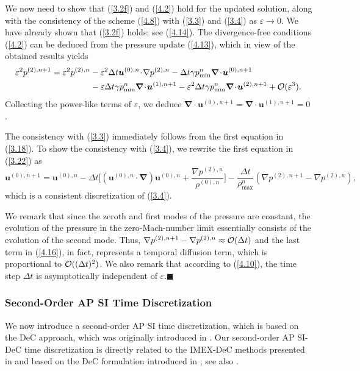 \documentclass[A4paper,12pt,twoside]{article}
\newenvironment{proof}{{\flushleft \bf Proof:}}{}
\numberwithin{equation}{section}
\numberwithin{figure}{section}
\numberwithin{table}{section}
\def\bnabla{\bm{\nabla}}
\newcommand{\dt}{\Delta t}
\newcommand{\ve}{\varepsilon}
\newcommand\eref[1]{(\ref{#1})}
\begin{document}
\begin{proof}
We now need to show that \eref{3.2f} and \eref{4.2} hold for the updated solution, along with the consistency of the scheme \eref{4.8} with
\eref{3.3} and \eref{3.4} as $\ve\to0$. We have already shown that \eref{3.2f} holds; see \eref{4.14}. The divergence-free conditions
\eref{4.2} can be deduced from the pressure update \eref{4.13}, which in view of the obtained results yields
$$
\begin{aligned}
\ve^2p^{(2),n+1}=\ve^2p^{(2),n}&-\ve^2\dt\bm u^{(0),n}\!\cdot\!\nabla p^{(2),n}-\dt\gamma p_{\min}^n\bnabla\!\cdot\!\bm u^{(0),n+1}\\
&-\ve\dt\gamma p_{\min}^n\bnabla\!\cdot\!\bm u^{(1),n+1}-\ve^2\dt\gamma p_{\min}^n\bnabla\!\cdot\!\bm u^{(2),n+1}+{\cal O}(\ve^3).
\end{aligned}
$$
Collecting the power-like terms of $\ve$, we deduce $\bnabla\!\cdot\!\bm u^{(0),n+1}=\bnabla\!\cdot\!\bm u^{(1),n+1}=0$.

The consistency with \eref{3.3} immediately follows from the first equation in \eref{3.18}. To show the consistency with \eref{3.4}, we
rewrite the first equation in \eref{3.22} as
\begin{equation}
\bm u^{(0),n+1}=\bm u^{(0),n}-\dt\bigg[(\bm u^{(0),n}\!\cdot\!\bnabla)\bm u^{(0),n}+\frac{\nabla p^{(2),n}}{\rho^{(0),n}}\bigg]
-\frac{\dt}{\rho_{\max}^n}\left(\nabla p^{(2),n+1}-\nabla p^{(2),n}\right),
\label{4.16}
\end{equation}
which is a consistent discretization of \eref{3.4}.

We remark that since the zeroth and first modes of the pressure are constant, the evolution of the pressure in the zero-Mach-number limit
essentially consists of the evolution of the second mode. Thus, $\nabla p^{(2),n+1}-\nabla p^{(2),n}\approx{\cal O}(\dt)$ and the last term
in \eref{4.16}, in fact, represents a temporal diffusion term, which is proportional to ${\cal O}((\dt)^2)$. We also remark that according
to \eref{4.10}, the time step $\dt$ is asymptotically independent of $\ve$.\hfill$\blacksquare$
\end{proof}

\subsubsection{Second-Order AP SI Time Discretization}\label{sec313}
We now introduce a second-order AP SI time discretization, which is based on the DeC approach, which was originally introduced in
\cite{fox1949some}. Our second-order AP SI-DeC time discretization is directly related to the IMEX-DeC methods presented in
\cite{offner2025analysis} and based on the DeC formulation introduced in \cite{Decremi}; see also
\cite{micalizzi2025efficient,micalizzi2024new}.
\end{document}
